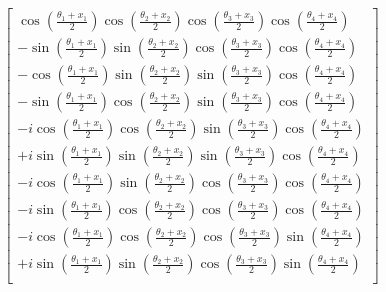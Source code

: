 \documentclass[12pt]{article}
\numberwithin{equation}{section}  %
\theoremstyle{definition}
\theoremstyle{plain}
\theoremstyle{remark}
\begin{document}
\begin{equation}
\begin{bmatrix}
\cos\left(\frac{\theta_1+x_1}{2}\right)
\cos\left(\frac{\theta_2+x_2}{2}\right)
\cos\left(\frac{\theta_3+x_3}{2}\right)
\cos\left(\frac{\theta_4+x_4}{2}\right)
\\[6pt]

-\sin\left(\frac{\theta_1+x_1}{2}\right)
\sin\left(\frac{\theta_2+x_2}{2}\right)
\cos\left(\frac{\theta_3+x_3}{2}\right)
\cos\left(\frac{\theta_4+x_4}{2}\right)
\\[6pt]

-\cos\left(\frac{\theta_1+x_1}{2}\right)
\sin\left(\frac{\theta_2+x_2}{2}\right)
\sin\left(\frac{\theta_3+x_3}{2}\right)
\cos\left(\frac{\theta_4+x_4}{2}\right)
\\[6pt]

-\sin\left(\frac{\theta_1+x_1}{2}\right)
\cos\left(\frac{\theta_2+x_2}{2}\right)
\sin\left(\frac{\theta_3+x_3}{2}\right)
\cos\left(\frac{\theta_4+x_4}{2}\right)
\\[6pt]

-i\cos\left(\frac{\theta_1+x_1}{2}\right)
\cos\left(\frac{\theta_2+x_2}{2}\right)
\sin\left(\frac{\theta_3+x_3}{2}\right)
\cos\left(\frac{\theta_4+x_4}{2}\right)
\\[6pt]

+i\sin\left(\frac{\theta_1+x_1}{2}\right)
\sin\left(\frac{\theta_2+x_2}{2}\right)
\sin\left(\frac{\theta_3+x_3}{2}\right)
\cos\left(\frac{\theta_4+x_4}{2}\right)
\\[6pt]

-i\cos\left(\frac{\theta_1+x_1}{2}\right)
\sin\left(\frac{\theta_2+x_2}{2}\right)
\cos\left(\frac{\theta_3+x_3}{2}\right)
\cos\left(\frac{\theta_4+x_4}{2}\right)
\\[6pt]

-i\sin\left(\frac{\theta_1+x_1}{2}\right)
\cos\left(\frac{\theta_2+x_2}{2}\right)
\cos\left(\frac{\theta_3+x_3}{2}\right)
\cos\left(\frac{\theta_4+x_4}{2}\right)
\\[6pt]

-i\cos\left(\frac{\theta_1+x_1}{2}\right)
\cos\left(\frac{\theta_2+x_2}{2}\right)
\cos\left(\frac{\theta_3+x_3}{2}\right)
\sin\left(\frac{\theta_4+x_4}{2}\right)
\\[6pt]

+i\sin\left(\frac{\theta_1+x_1}{2}\right)
\sin\left(\frac{\theta_2+x_2}{2}\right)
\cos\left(\frac{\theta_3+x_3}{2}\right)
\sin\left(\frac{\theta_4+x_4}{2}\right)
\\[6pt]


\end{bmatrix}
\end{equation}
\end{document}
